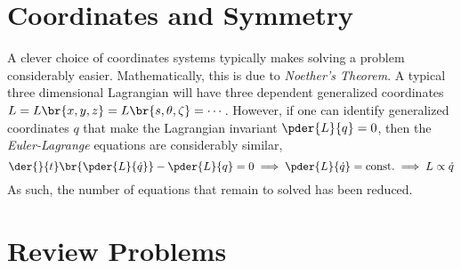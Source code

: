 \documentclass{article}
\begin{document}
\titlePage

\tableOfContents

\disclaimer

\section{Coordinates and Symmetry}

A clever choice of coordinates systems typically makes solving a problem considerably easier. Mathematically, this is due to \textit{Noether's Theorem}. A typical three dimensional Lagrangian will have three dependent generalized coordinates $L = L \br{x,y,z} = L \br{s,\theta,\zeta} = \cdots$. However, if one can identify generalized coordinates $q$ that make the Lagrangian invariant $\pder{L}{q} = 0$, then the \textit{Euler-Lagrange} equations are considerably similar,
\[ \der{}{t}\br{\pder{L}{\dot{q}}} - \pder{L}{q} = 0 \implies \pder{L}{\dot{q}} = \textrm{const.} \implies L \propto \dot{q} \]
As such, the number of equations that remain to solved has been reduced.

\section{Review Problems}

\newcommand{\coord}[4]{\coordinate (#1) at (#2,#3,#4);}
\newcommand{\cylindcoord}[4]{\coordinate (#1) at ({#2*cos(#3)},{#2*sin(#3)},{#4});}
\newcommand{\spherecoord}[4]{\coordinate (#1) at ({#2*cos(#3)*sin(#4)},{#2*sin(#3)*sin(#4)},{#2*cos(#4)});}

\pgfmathsetmacro{}
\pgfmathsetmacro{}
\tdplotsetmaincoords{\th}{\az}
\end{document}
